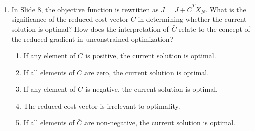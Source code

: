 \documentclass{article}%
\begin{document}
\begin{enumerate}
\begin{enumerate}
\begin{enumerate}
\item It reduces the number of variables in the problem, simplifying the calculations.%
\item It allows for the use of Gaussian elimination to solve the system of equations.%
\item It is not directly related to simplifying the constraint representation.%
\end{enumerate}%
\vspace{0.5em}%
\item In Slide 8, the objective function is rewritten as $ J = \bar{J} + \bar{C}^T X_N $. What is the significance of the reduced cost vector $ \bar{C} $ in determining whether the current solution is optimal?  How does the interpretation of $ \bar{C} $ relate to the concept of the reduced gradient in unconstrained optimization?%
\begin{enumerate}%
\item If any element of $ \bar{C} $ is positive, the current solution is optimal.%
\item If all elements of $ \bar{C} $ are zero, the current solution is optimal.%
\item If any element of $ \bar{C} $ is negative, the current solution is optimal.%
\item The reduced cost vector is irrelevant to optimality.%
\item If all elements of $ \bar{C} $ are non-negative, the current solution is optimal.%
\end{enumerate}%
\vspace{0.5em}%
\end{enumerate}%
\end{enumerate}

%
\newpage%
\end{document}
